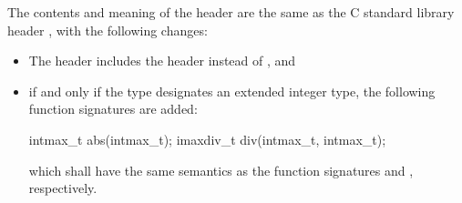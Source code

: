\pnum
{}%
%
The contents and meaning of the header 
are the same as the C standard library header ,
with the following changes:
\begin{itemize}
\item
The header  includes the header  instead
of , and
\item
if and only if the type  designates an extended integer
type, the following function signatures are added:
\begin{codeblock}
intmax_t abs(intmax_t);
imaxdiv_t div(intmax_t, intmax_t);
\end{codeblock}
which shall have the same semantics as the function signatures
 and
, respectively.
\end{itemize}

